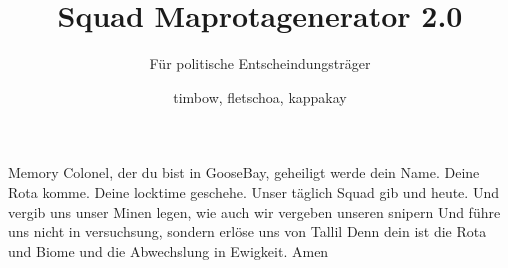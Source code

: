 \documentclass[a4paper, 11pt]{scrartcl}
\title{Squad Maprotagenerator 2.0}
\subtitle{Für politische Entscheindungsträger}
\author{timbow, fletschoa, kappakay}
\begin{document}
    
    \maketitle
    
    \tableofcontents
    \newpage

    Memory Colonel, der du bist in GooseBay, geheiligt werde dein Name.
    Deine Rota komme.
    Deine locktime geschehe.
    Unser täglich Squad gib und heute. Und vergib uns unser Minen legen, wie auch wir vergeben unseren snipern
    Und führe uns nicht in versuchsung, sondern erlöse uns von Tallil
    Denn dein ist die Rota und Biome und die Abwechslung in Ewigkeit.
    Amen

    \newpage
    \listoffigures
    \label{sec:abkuerzungverzeichnis}
    \newpage

    
    
    

    

    
\end{document}
